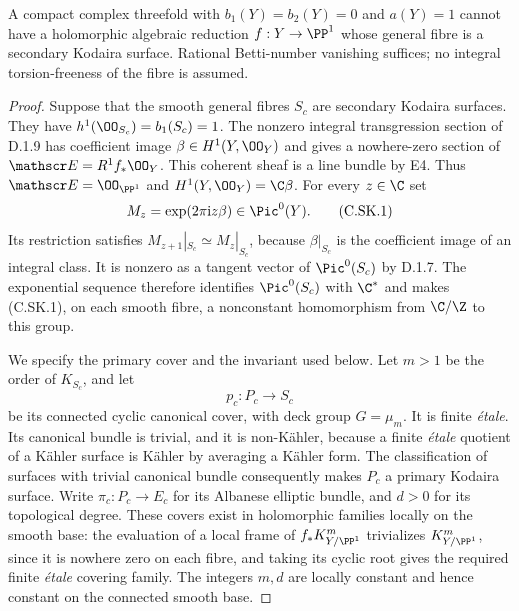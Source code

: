 \begin{theorem}
\label{st:C.3.9}
A compact complex threefold with $b_1(Y)=b_2(Y)=0$ and
$a(Y)=1$ cannot have a holomorphic algebraic reduction
$f:Y\to\PP^1$ whose general fibre is a secondary Kodaira
surface. Rational Betti-number vanishing suffices; no integral
torsion-freeness of the fibre is assumed.
\end{theorem}
\begin{proof}
Suppose that the smooth general fibres $S_c$ are secondary
Kodaira surfaces. They have $h^1(\OO_{S_c})=b_1(S_c)=1$.
The nonzero integral transgression section of D.1.9 has
coefficient image $\beta\in H^1(Y,\OO_Y)$ and gives a
nowhere-zero section of $\mathscr E=R^1f_*\OO_Y$.
This coherent sheaf is a line bundle by E4. Thus
$\mathscr E=\OO_{\PP^1}$ and
$H^1(Y,\OO_Y)=\C\beta$. For every $z\in\C$ set
\[
 M_z=\exp(2\pi\mathrm i z\beta)\in\Pic^0(Y).
\tag{C.SK.1}
\]
Its restriction satisfies $M_{z+1}|_{S_c}\simeq M_z|_{S_c}$,
because $\beta|_{S_c}$ is the coefficient image of an
integral class. It is nonzero as a tangent vector of
$\Pic^0(S_c)$ by D.1.7. The exponential sequence therefore
identifies $\Pic^0(S_c)$ with $\C^*$ and makes (C.SK.1), on
each smooth fibre, a nonconstant homomorphism from
$\C/\Z$ to this group.

We specify the primary cover and the invariant used below.
Let $m>1$ be the order of $K_{S_c}$, and let
\[
 p_c:P_c\longrightarrow S_c
\]
be its connected cyclic canonical cover, with deck group
$G=\mu_m$. It is finite \emph{\'etale}. Its canonical bundle
is trivial, and it is non-K\"ahler, because a finite
\emph{\'etale} quotient of a K\"ahler surface is K\"ahler
by averaging a K\"ahler form. The classification of
surfaces with trivial canonical bundle consequently makes
$P_c$ a primary Kodaira surface. Write
$\pi_c:P_c\to E_c$ for its Albanese elliptic bundle, and
$d>0$ for its topological degree. These covers exist in
holomorphic families locally on the smooth base: the
evaluation of a local frame of $f_*K_{Y/\PP^1}^{m}$
trivializes $K_{Y/\PP^1}^{m}$, since it is nowhere zero on
each fibre, and taking its cyclic root gives the required
finite \emph{\'etale} covering family. The integers $m,d$
are locally constant and hence constant on the connected
smooth base.


\end{proof}
